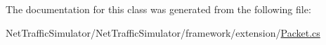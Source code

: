 The documentation for this class was generated from the following file\-:\begin{DoxyCompactItemize}
\item 
Net\-Traffic\-Simulator/\-Net\-Traffic\-Simulator/framework/extension/\hyperlink{Packet_8cs}{Packet.\-cs}\end{DoxyCompactItemize}
